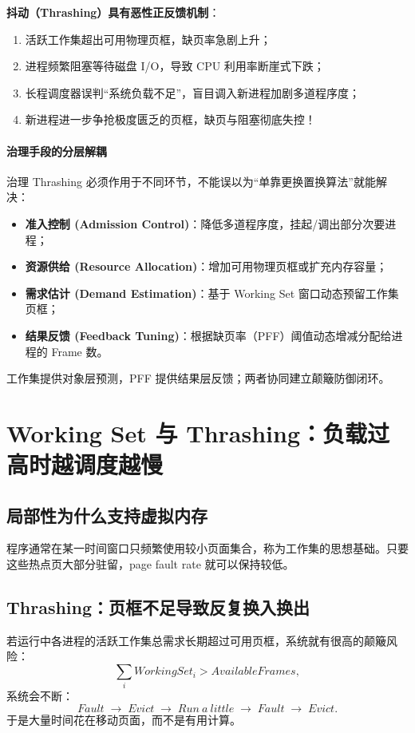 \documentclass[11pt,a4paper]{ctexart}
\newcommand{\kw}[1]{\textbf{#1}}
\newcommand{\arr}{\;\longrightarrow\;}
\begin{document}
\kw{抖动（Thrashing）具有恶性正反馈机制}：
\begin{enumerate}
  \item 活跃工作集超出可用物理页框，缺页率急剧上升；
  \item 进程频繁阻塞等待磁盘 I/O，导致 CPU 利用率断崖式下跌；
  \item 长程调度器误判“系统负载不足”，盲目调入新进程加剧多道程序度；
  \item 新进程进一步争抢极度匮乏的页框，缺页与阻塞彻底失控！
\end{enumerate}

\paragraph{治理手段的分层解耦}
治理 Thrashing 必须作用于不同环节，不能误以为“单靠更换置换算法”就能解决：
\begin{itemize}
  \item \kw{准入控制 (Admission Control)}：降低多道程序度，挂起/调出部分次要进程；
  \item \kw{资源供给 (Resource Allocation)}：增加可用物理页框或扩充内存容量；
  \item \kw{需求估计 (Demand Estimation)}：基于 Working Set 窗口动态预留工作集页框；
  \item \kw{结果反馈 (Feedback Tuning)}：根据缺页率（PFF）阈值动态增减分配给进程的 Frame 数。
\end{itemize}
工作集提供对象层预测，PFF 提供结果层反馈；两者协同建立颠簸防御闭环。

\section{Working Set 与 Thrashing：负载过高时越调度越慢}

\subsection{局部性为什么支持虚拟内存}
程序通常在某一时间窗口只频繁使用较小页面集合，称为工作集的思想基础。只要这些热点页大部分驻留，page fault rate 就可以保持较低。

\subsection{Thrashing：页框不足导致反复换入换出}
若运行中各进程的活跃工作集总需求长期超过可用页框，系统就有很高的颠簸风险：
\[
\sum_i WorkingSet_i > AvailableFrames,
\]
系统会不断：
\[
Fault\arr Evict\arr Run\ a\ little\arr Fault\arr Evict.
\]
于是大量时间花在移动页面，而不是有用计算。
\end{document}

